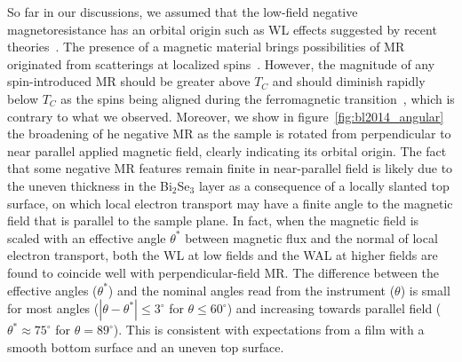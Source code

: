 So far in our discussions, we assumed that the low-field negative magnetoresistance has an orbital origin such as WL effects suggested by recent theories~\cite{WL_WAL_competition, WL_Glazman, WL_bulk_Lu}. The presence of a magnetic material brings possibilities of MR originated from scatterings at localized spins~\cite{KondoMR}. However, the magnitude of any spin-introduced MR should be greater above $T_C$ and should diminish rapidly below $T_C$ as the spins being aligned during the ferromagnetic transition~\cite{SpinMagnetic}, which is contrary to what we observed. Moreover, we show in figure~\ref{fig:bl2014_angular} the broadening of he negative MR  as the sample is rotated  from perpendicular to near parallel applied magnetic field, clearly indicating its orbital origin. The fact that some negative  MR features remain finite in near-parallel field is likely due to the uneven thickness in the Bi$_2$Se$_3$ layer as a consequence of a locally slanted top surface, on which local electron transport may have a finite angle to the magnetic field that is parallel to the sample plane. In fact, when the magnetic field is scaled with an effective angle $\theta^*$ between magnetic flux and the normal of local electron transport, both the WL at low fields and the WAL at higher fields are found to coincide well with perpendicular-field MR. The difference between the effective angles ($\theta^*$) and the nominal angles read from the instrument ($\theta$) is small for most angles ($|\theta-\theta^*|\leq{}3^\circ$ for $\theta\leq{}60^\circ$) and increasing towards parallel field ($\theta^*\approx{}75^\circ$ for $\theta=89^\circ$). This is consistent with expectations from a film with a smooth bottom surface and an uneven top surface.

